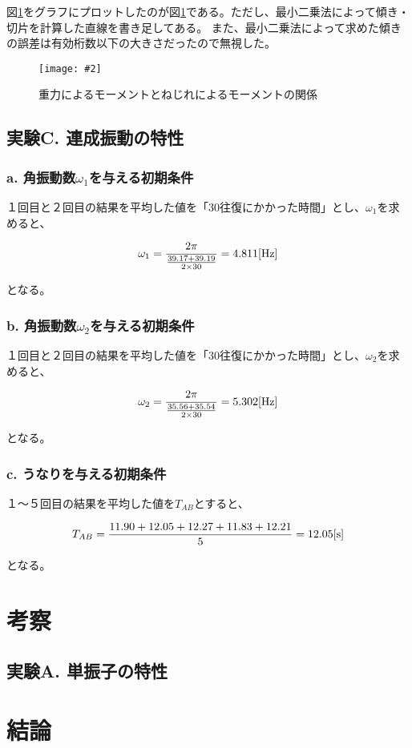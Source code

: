 \documentclass[uplatex,11pt]{jsarticle}
\newcommand{\fg}[3]{ %
    \begin{figure}
        \begin{center}
            \texttt{[image: \#2]}
            \caption{#3}
            \label{fg_#1}
        \end{center}
    \end{figure}
}
\newcommand{\fr}[1]{図\ref{fg_#1}}
\begin{document}
\fr{B}をグラフにプロットしたのが\fr{B}である。ただし、最小二乗法によって傾き・切片を計算した直線を書き足してある。
また、最小二乗法によって求めた傾きの誤差は有効桁数以下の大きさだったので無視した。

\fg{B}{graph/b_with_regression.png}{重力によるモーメントとねじれによるモーメントの関係}

\subsection*{実験C. 連成振動の特性}

\subsubsection*{a. 角振動数$\omega_1$を与える初期条件}

１回目と２回目の結果を平均した値を「30往復にかかった時間」とし、$\omega_1$を求めると、

\[
    \omega_1 = \frac{2\pi}{\frac{39.17 + 39.19}{2 \times 30}} = 4.811 [{\rm Hz}]
\]

となる。

\subsubsection*{b. 角振動数$\omega_2$を与える初期条件}

１回目と２回目の結果を平均した値を「30往復にかかった時間」とし、$\omega_2$を求めると、

\[
    \omega_2 = \frac{2\pi}{\frac{35.56 + 35.54}{2 \times 30}} = 5.302 [{\rm Hz}]
\]

となる。

\subsubsection*{c. うなりを与える初期条件}

１〜５回目の結果を平均した値を$T_{AB}$とすると、

\[
    T_{AB} = \frac{11.90 + 12.05 + 12.27 + 11.83 + 12.21}{5} = 12.05 [{\rm s}]
\]

となる。

\section{考察}

\subsection*{実験A. 単振子の特性}


\section{結論}
\end{document}
